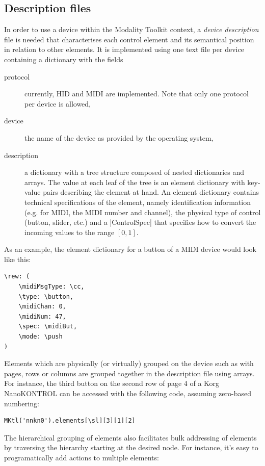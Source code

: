 \documentclass{article}
\begin{document}
\subsection{Description files}
\label{sub:descriptions_files}

In order to use a device within the Modality Toolkit context, a \textit{device description} file is needed that characterises each control element and its semantical position in relation to other elements.
It is implemented using one text file per device containing a dictionary with the fields 
\begin{description}
	\item[protocol] currently, HID and MIDI are implemented. Note that only one protocol per device is allowed,
	\item[device] the name of the device as provided by the operating system,
	\item[description] a dictionary with a tree structure composed of nested dictionaries and arrays. The value at each leaf of the tree is an element dictionary with key-value pairs describing the element at hand.
	An element dictionary contains technical specifications of the element, namely identification information (e.g. for MIDI, the MIDI number and channel), the physical type of control (button, slider, etc.) and a |ControlSpec| that specifies how to convert the incoming values to the range $[0,1]$.
\end{description}

As an example, the element dictionary for a button of a MIDI device would look like this:
\begin{Verbatim}
\rew: (
	\midiMsgType: \cc,
	\type: \button,
	\midiChan: 0,
	\midiNum: 47,
	\spec: \midiBut,
	\mode: \push
)
\end{Verbatim}

Elements which are physically (or virtually) grouped on the device such as with pages, rows or columns are grouped together in the description file using arrays. For instance, the third button on the second row of page 4 of a Korg NanoKONTROL can be accessed with the following code, assuming zero-based numbering:

\begin{Verbatim}
MKtl('nnkn0').elements[\sl][3][1][2]
\end{Verbatim}

The hierarchical grouping of elements also facilitates bulk addressing of elements by traversing the hierarchy starting at the desired node. For instance, it's easy to programatically add actions to multiple elements:
\end{document}
